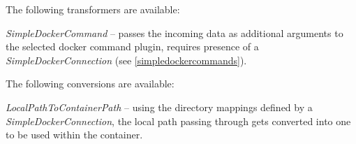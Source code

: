 \documentclass[a4paper]{book}
\begin{document}
\noindent The following transformers are available:
\begin{tight_itemize}
  \item \textit{SimpleDockerCommand} -- passes the incoming data as additional arguments to the selected docker
  command plugin, requires presence of a \textit{SimpleDockerConnection} (see \ref{simpledockercommands}).
\end{tight_itemize}

\noindent The following conversions are available:
\begin{tight_itemize}
  \item \textit{LocalPathToContainerPath} -- using the directory mappings defined by a \textit{SimpleDockerConnection},
  the local path passing through gets converted into one to be used within the container.
\end{tight_itemize}

\end{document}
